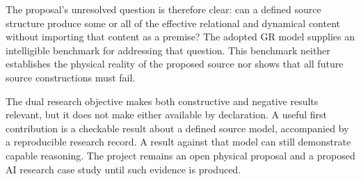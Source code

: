 \documentclass[11pt]{article}
\begin{document}
The proposal's unresolved question is therefore clear: can a defined source structure produce some or all of the effective relational and dynamical content without importing that content as a premise? The adopted GR model supplies an intelligible benchmark for addressing that question. This benchmark neither establishes the physical reality of the proposed source nor shows that all future source constructions must fail.

The dual research objective makes both constructive and negative results relevant, but it does not make either available by declaration. A useful first contribution is a checkable result about a defined source model, accompanied by a reproducible research record. A result against that model can still demonstrate capable reasoning. The project remains an open physical proposal and a proposed AI research case study until such evidence is produced.

\References
\end{document}
